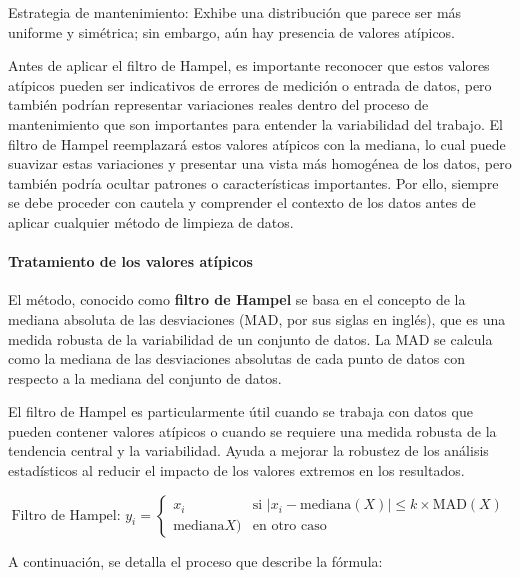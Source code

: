 \documentclass[
  11pt,
  bookmarksnumbered]{article}
\begin{document}
Estrategia de mantenimiento: Exhibe una distribución que parece ser más uniforme y simétrica; sin embargo, aún hay presencia de valores atípicos.

Antes de aplicar el filtro de Hampel, es importante reconocer que estos valores atípicos pueden ser indicativos de errores de medición o entrada de datos, pero también podrían representar variaciones reales dentro del proceso de mantenimiento que son importantes para entender la variabilidad del trabajo.
El filtro de Hampel reemplazará estos valores atípicos con la mediana, lo cual puede suavizar estas variaciones y presentar una vista más homogénea de los datos, pero también podría ocultar patrones o características importantes.
Por ello, siempre se debe proceder con cautela y comprender el contexto de los datos antes de aplicar cualquier método de limpieza de datos.

\hypertarget{tratamiento-de-los-valores-atuxedpicos}{%
\paragraph{Tratamiento de los valores atípicos}\label{tratamiento-de-los-valores-atuxedpicos}}

El método, conocido como \textbf{filtro de Hampel} se basa en el concepto de la mediana absoluta de las desviaciones (MAD, por sus siglas en inglés), que es una medida robusta de la variabilidad de un conjunto de datos.
La MAD se calcula como la mediana de las desviaciones absolutas de cada punto de datos con respecto a la mediana del conjunto de datos.

El filtro de Hampel es particularmente útil cuando se trabaja con datos que pueden contener valores atípicos o cuando se requiere una medida robusta de la tendencia central y la variabilidad.
Ayuda a mejorar la robustez de los análisis estadísticos al reducir el impacto de los valores extremos en los resultados.


\begin{equation}\text{Filtro de Hampel: } y_i = \begin{cases} x_i & \text{si } |x_i - \text{mediana}(X)| \leq k \times \text{MAD}(X) \\ \text{mediana} X) & \text{en otro caso} \end{cases}\end{equation}

A continuación, se detalla el proceso que describe la fórmula:
\end{document}
